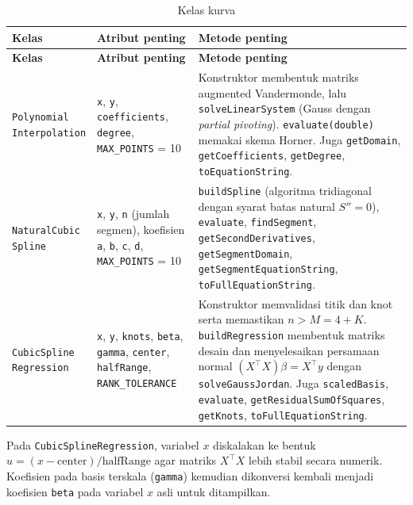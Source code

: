\documentclass[12pt,a4paper]{report}
\begin{document}
\begin{longtable}{L{2.9cm} L{3.7cm} L{7.9cm}}
\caption{Kelas kurva}\label{tab:kelas-kurva}\\
\toprule
\textbf{Kelas} & \textbf{Atribut penting} & \textbf{Metode penting} \\
\midrule
\endfirsthead
\toprule
\textbf{Kelas} & \textbf{Atribut penting} & \textbf{Metode penting} \\
\midrule
\endhead
\bottomrule
\endfoot
\texttt{Polynomial \newline Interpolation} &
\texttt{x}, \texttt{y}, \texttt{coefficients}, \texttt{degree}, \texttt{MAX\_POINTS} = 10 &
Konstruktor membentuk matriks augmented Vandermonde, lalu
\texttt{solveLinearSystem} (Gauss dengan \textit{partial pivoting}).
\texttt{evaluate(double)} memakai skema Horner. Juga
\texttt{getDomain}, \texttt{getCoefficients}, \texttt{getDegree},
\texttt{toEquationString}. \\
\addlinespace
\texttt{NaturalCubic \newline Spline} &
\texttt{x}, \texttt{y}, \texttt{n} (jumlah segmen), koefisien \texttt{a}, \texttt{b}, \texttt{c}, \texttt{d}, \texttt{MAX\_POINTS} = 10 &
\texttt{buildSpline} (algoritma tridiagonal dengan syarat batas natural
$S''=0$), \texttt{evaluate}, \texttt{findSegment},
\texttt{getSecondDerivatives}, \texttt{getSegmentDomain},
\texttt{getSegmentEquationString}, \texttt{toFullEquationString}. \\
\addlinespace
\texttt{CubicSpline \newline Regression} &
\texttt{x}, \texttt{y}, \texttt{knots}, \texttt{beta}, \texttt{gamma}, \texttt{center}, \texttt{halfRange}, \texttt{RANK\_TOLERANCE} &
Konstruktor memvalidasi titik dan knot serta memastikan $n > M = 4 + K$.
\texttt{buildRegression} membentuk matriks desain dan menyelesaikan persamaan
normal $(X^{\top}X)\beta = X^{\top}y$ dengan \texttt{solveGaussJordan}.
Juga \texttt{scaledBasis}, \texttt{evaluate},
\texttt{getResidualSumOfSquares}, \texttt{getKnots},
\texttt{toFullEquationString}. \\
\end{longtable}

Pada \texttt{CubicSplineRegression}, variabel $x$ diskalakan ke bentuk \newline 
$u = (x - \text{center})/\text{halfRange}$ agar matriks $X^{\top}X$ lebih
stabil secara numerik. Koefisien pada basis terskala (\texttt{gamma}) kemudian
dikonversi kembali menjadi koefisien \texttt{beta} pada variabel $x$ asli
untuk ditampilkan.
\end{document}
